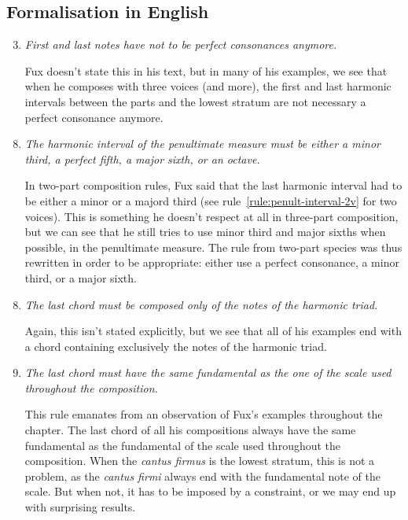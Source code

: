 \subsection{Formalisation in English} \label{sec:generalenglish}
\begin{enumerate}[wide, label=\bfseries 1.H2 and 1.H\arabic*]
    \setcounter{enumi}{2} %
    \item \greendots \textit{First and last notes have not to be perfect consonances anymore.} \label{rule:last-chord-not-perfect-anymore}    

    Fux doesn't state this in his text, but in many of his examples, we see that when he composes with three voices (and more), the first and last harmonic intervals between the parts and the lowest stratum are not necessary a perfect consonance anymore.
\end{enumerate}

\begin{enumerate}[wide, label=\bfseries 1.H7 and 1.H\arabic*]
    \setcounter{enumi}{7} %
    \item \greendots \textit{The harmonic interval of the penultimate measure must be either a minor
    third, a perfect fifth, a major sixth, or an octave.} \label{rule:penult-interval-3-voices}
    
    In two-part composition rules, Fux said that the last harmonic interval had to be either a minor or a majord third (see rule~\ref{rule:penult-interval-2v} for two voices). This is something he doesn't respect at all in three-part composition, but we can see that he still tries to use minor third and major sixths when possible, in the penultimate measure. The rule from two-part species was thus rewritten in order to be appropriate: either use a perfect consonance, a minor third, or a major sixth.
\end{enumerate}

\begin{enumerate}[wide, label=\bfseries G\arabic*]
    \setcounter{enumi}{7} %

    \item\label{rule:last-chord-h-triad} \textit{The last chord must be composed only of the notes of the harmonic triad.} 

    Again, this isn't stated explicitly, but we see that all of his examples end with a chord containing exclusively the notes of the harmonic triad.
    
    \item \textit{The last chord must have the same fundamental as the one of the scale used throughout the composition.}\label{rule:same-fundamental}

    This rule emanates from an observation of Fux's examples throughout the chapter. The last chord of all his compositions always have the same fundamental as the fundamental of the scale used throughout the composition.
    When the \textit{cantus firmus} is the lowest stratum, this is not a problem, as the \textit{cantus firmi} always end with the fundamental note of the scale. But when not, it has to be imposed by a constraint, or we may end up with surprising results.
\end{enumerate}

